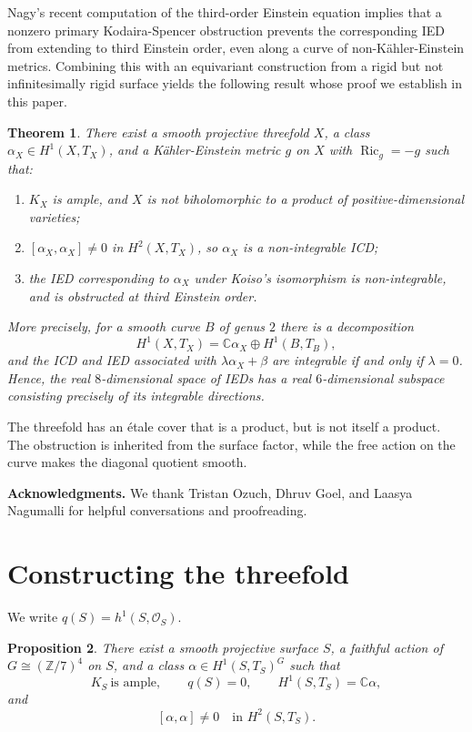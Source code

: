 \documentclass[11pt]{amsart}
\numberwithin{equation}{section}
\theoremstyle{plain}
\newtheorem{theorem}{Theorem}[section]
\newtheorem{proposition}[theorem]{Proposition}
\theoremstyle{definition}
\newcommand{\C}{\mathbb{C}}
\newcommand{\Z}{\mathbb{Z}}
\newcommand{\cO}{\mathcal{O}}
\DeclareMathOperator{\Ric}{Ric}
\begin{document}
Nagy's recent computation of the third-order Einstein equation \cite{NagyThird} implies that a nonzero primary Kodaira-Spencer obstruction prevents the corresponding IED from extending to third Einstein order, even along a curve of non-K\"ahler-Einstein metrics. Combining this with an equivariant construction from a rigid but not infinitesimally rigid surface yields the following result whose proof we establish in this paper.

\begin{theorem}\label{thm:main}
There exist a smooth projective threefold $X$, a class $\alpha_X\in H^1(X,T_X)$, and a K\"ahler-Einstein metric $g$ on $X$ with $\Ric_g=-g$ such that:
\begin{enumerate}[label=\textup{(\roman*)},leftmargin=2.3em]
\item $K_X$ is ample, and $X$ is not biholomorphic to a product of positive-dimensional varieties;
\item $[\alpha_X,\alpha_X]\neq0$ in $H^2(X,T_X)$, so $\alpha_X$ is a non-integrable ICD;
\item the IED corresponding to $\alpha_X$ under Koiso's isomorphism is non-integrable, and is obstructed at third Einstein order.
\end{enumerate}
More precisely, for a smooth curve $B$ of genus $2$ there is a decomposition
$$H^1(X,T_X)=\C\alpha_X\oplus H^1(B,T_B),$$
and the ICD and IED associated with $\lambda\alpha_X+\beta$ are integrable if and only if $\lambda=0$. Hence, the real $8$-dimensional space of IEDs has a real $6$-dimensional subspace consisting precisely of its integrable directions.
\end{theorem}

The threefold has an \'etale cover that is a product, but is not itself a product. The obstruction is inherited from the surface factor, while the free action on the curve makes the diagonal quotient smooth. 

\textbf{Acknowledgments.} We thank Tristan Ozuch, Dhruv Goel, and Laasya Nagumalli for helpful conversations and proofreading. 

\section{Constructing the threefold}

We write $q(S)=h^1(S,\cO_S)$.

\begin{proposition}\label{prop:surface}
There exist a smooth projective surface $S$, a faithful action of $G\cong(\Z/7)^4$
on $S$, and a class $\alpha\in H^1(S,T_S)^G$ such that
$$K_S\ \text{is ample},\qquad q(S)=0,\qquad
H^1(S,T_S)=\C\alpha,$$
and
$$
[\alpha,\alpha]\neq0\quad\text{in }H^2(S,T_S).$$
\end{proposition}
\end{document}
